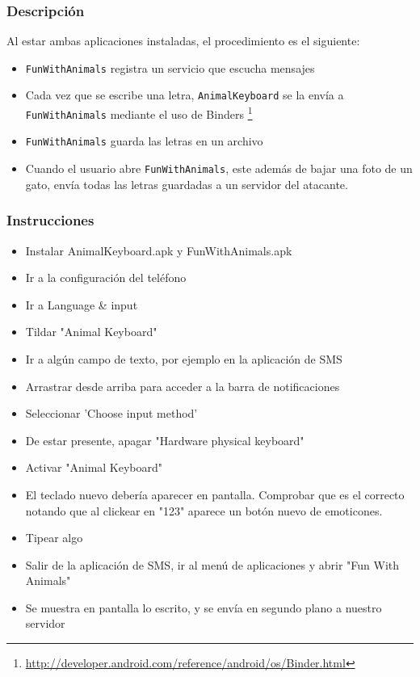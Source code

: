 		\subsubsection{Descripción}
		Al estar ambas aplicaciones instaladas, el procedimiento es el siguiente:
			\begin{itemize}
				\item \texttt{FunWithAnimals} registra un servicio que escucha mensajes
				\item Cada vez que se escribe una letra, \texttt{AnimalKeyboard} se la envía a \texttt{FunWithAnimals} mediante el uso de Binders \footnote{\url{http://developer.android.com/reference/android/os/Binder.html}}
				\item \texttt{FunWithAnimals} guarda las letras en un archivo
				\item Cuando el usuario abre \texttt{FunWithAnimals}, este además de bajar una foto de un gato, envía todas las letras guardadas a un servidor del atacante.
			\end{itemize}

		\subsubsection{Instrucciones}
			\begin{itemize}
				\item Instalar AnimalKeyboard.apk y FunWithAnimals.apk
				\item Ir a la configuración del teléfono
				\item Ir a Language \& input
				\item Tildar "Animal Keyboard"
				\item Ir a algún campo de texto, por ejemplo en la aplicación de SMS
				\item Arrastrar desde arriba para acceder a la barra de notificaciones
				\item Seleccionar 'Choose input method'
				\item De estar presente, apagar "Hardware physical keyboard"
				\item Activar "Animal Keyboard"
				\item El teclado nuevo debería aparecer en pantalla. Comprobar que es el correcto notando que al clickear en "123" aparece un botón nuevo de emoticones.
				\item Tipear algo
				\item Salir de la aplicación de SMS, ir al menú de aplicaciones y abrir "Fun With Animals"
				\item Se muestra en pantalla lo escrito, y se envía en segundo plano a nuestro servidor
			\end{itemize}
